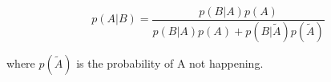 \[  
p(A | B) = \frac {p(B | A)p(A)}{ p(B | A)p(A) + p(B | \tilde{A} )p(\tilde{A})}\]
\par
where $p(\tilde{A})$ is the probability of A not happening.